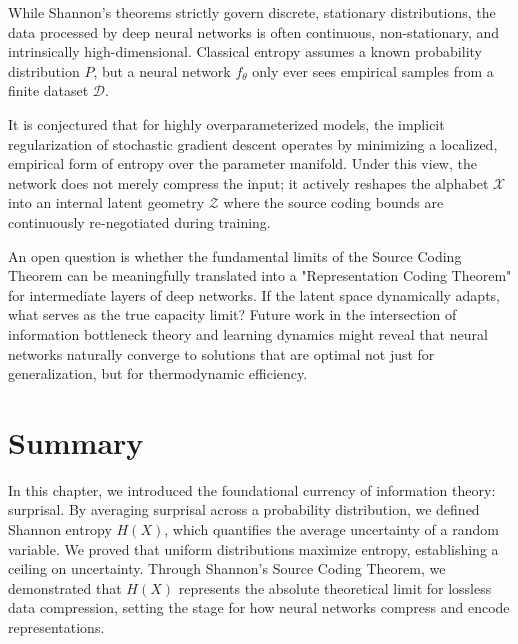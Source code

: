 \begin{horizon}
While Shannon's theorems strictly govern discrete, stationary distributions, the data processed by deep neural networks is often continuous, non-stationary, and intrinsically high-dimensional. Classical entropy assumes a known probability distribution $P$, but a neural network $f_\theta$ only ever sees empirical samples from a finite dataset $\mathcal{D}$. 

It is conjectured that for highly overparameterized models, the implicit regularization of stochastic gradient descent operates by minimizing a localized, empirical form of entropy over the parameter manifold. Under this view, the network does not merely compress the input; it actively reshapes the alphabet $\mathcal{X}$ into an internal latent geometry $\mathcal{Z}$ where the source coding bounds are continuously re-negotiated during training. 

An open question is whether the fundamental limits of the Source Coding Theorem can be meaningfully translated into a "Representation Coding Theorem" for intermediate layers of deep networks. If the latent space dynamically adapts, what serves as the true capacity limit? Future work in the intersection of information bottleneck theory and learning dynamics might reveal that neural networks naturally converge to solutions that are optimal not just for generalization, but for thermodynamic efficiency.
\end{horizon}

\section*{Summary}
In this chapter, we introduced the foundational currency of information theory: surprisal. By averaging surprisal across a probability distribution, we defined Shannon entropy $H(X)$, which quantifies the average uncertainty of a random variable. We proved that uniform distributions maximize entropy, establishing a ceiling on uncertainty. Through Shannon's Source Coding Theorem, we demonstrated that $H(X)$ represents the absolute theoretical limit for lossless data compression, setting the stage for how neural networks compress and encode representations.

